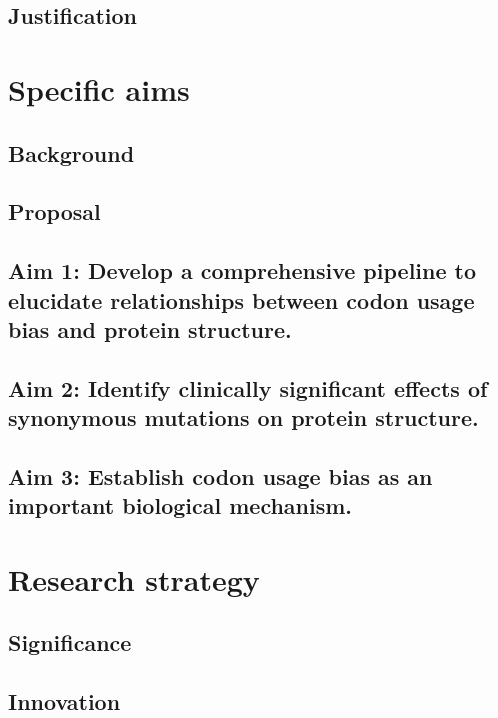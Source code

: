 \documentclass[11pt]{nih}
\begin{document}
\subsection{Justification}


\section{Specific aims}

\subsection{Background}

\subsection{Proposal}

\subsection{Aim 1: Develop a comprehensive pipeline to elucidate relationships between codon usage bias and protein structure.}

\subsection{Aim 2: Identify clinically significant effects of synonymous mutations on protein structure.}

\subsection{Aim 3: Establish codon usage bias as an important biological mechanism.}


\section{Research strategy}


\subsection{Significance}



\subsection{Innovation}
\end{document}
